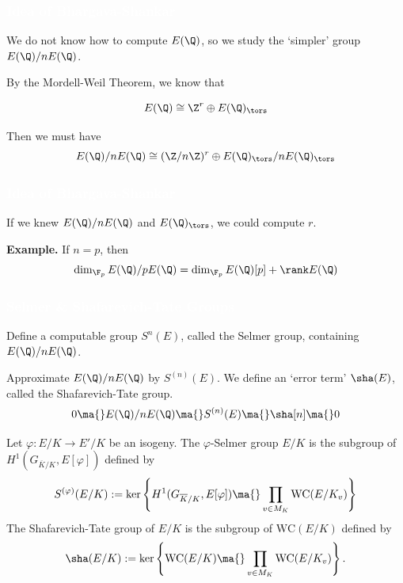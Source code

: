 \begin{frame}
\frametitle{\textcolor{white}{Idea of Bhargava-Shankar}}

We do not know how to compute $E(\Q)$, so we study the `simpler' group $E(\Q)/nE(\Q)$. \pause \par \vspace{0.75cm}

By the Mordell-Weil Theorem, we know that 

	\[
	E(\Q) \cong \Z^r \oplus E(\Q)_\tors
	\] \pause 

Then we must have
	\[
	E(\Q)/nE(\Q) \cong (\Z/n\Z)^r \oplus E(\Q)_\tors/nE(\Q)_\tors
	\]
\end{frame}



\begin{frame}
\frametitle{\textcolor{white}{Idea of Bhargava-Shankar}}
If we knew $E(\Q)/nE(\Q)$ and $E(\Q)_\tors$, we could compute $r$. \pause \par \vspace{0.5cm}

\textbf{Example.} If $n=p$, then
	\[
	\dim_{\F_p} E(\Q)/pE(\Q)= \dim_{\F_p} E(\Q)[p] + \rank E(\Q)
	\]
\end{frame}



\begin{frame}
\frametitle{\textcolor{white}{Selmer \& Shafarevich-Tate Groups}}
Define a computable group $S^n(E)$, called the Selmer group, containing $E(\Q)/nE(\Q)$. \pause \par \vspace{0.5cm}

Approximate $E(\Q)/nE(\Q)$ by $S^{(n)}(E)$. We define an `error term' $\sha(E)$, called the Shafarevich-Tate group. 
	\[
	0 \ma{} E(\Q)/nE(\Q) \ma{} S^{(n)}(E) \ma{} \sha[n] \ma{} 0
	\]
\end{frame}



\begin{frame}
\begin{dfn}
Let $\varphi: E/K \to E'/K$ be an isogeny. The $\varphi$-Selmer group $E/K$ is the subgroup of $H^1(G_{\overline{K}/K}, E[\varphi])$ defined by
	\[
	S^{(\varphi)}(E/K):= \ker \left\{ H^1(G_{\overline{K}/K}, E[\varphi]) \ma{} \prod_{v \in M_K} \text{WC}(E/K_v) \right\}
	\]
The Shafarevich-Tate group of $E/K$ is the subgroup of $\text{WC}(E/K)$ defined by
	\[
	\sha(E/K):= \ker \left\{ \text{WC}(E/K) \ma{} \prod_{v \in M_K} \text{WC}(E/K_v) \right\}.
	\]
\end{dfn}
\end{frame}



